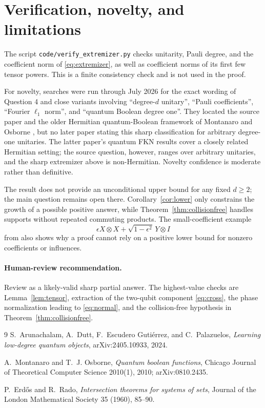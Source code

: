 \documentclass[11pt]{article}
\begin{document}
\section{Verification, novelty, and limitations}

The script \texttt{code/verify\_extremizer.py} checks unitarity, Pauli degree,
and the coefficient norm of \eqref{eq:extremizer}, as well as coefficient
norms of its first few tensor powers.  This is a finite consistency check and
is not used in the proof.

For novelty, searches were run through July 2026 for the exact wording of
Question 4 and close variants involving ``degree-$d$ unitary'', ``Pauli
coefficients'', ``Fourier $\ell_1$ norm'', and ``quantum Boolean degree one''.
They located the source paper and the older Hermitian quantum-Boolean
framework of Montanaro and Osborne \cite{MO}, but no later paper stating this
sharp classification for arbitrary degree-one unitaries.  The latter paper's
quantum FKN results cover a closely related Hermitian setting; the source
question, however, ranges over arbitrary unitaries, and the sharp extremizer
above is non-Hermitian.  Novelty confidence is moderate rather than
definitive.

The result does not provide an unconditional upper bound for any fixed
$d\ge2$; the main question remains open there.  Corollary~\ref{cor:lower}
only constrains the growth of a possible positive answer, while
Theorem~\ref{thm:collisionfree} handles supports without repeated commuting
products.  The small-coefficient example
\[
 \epsilon X\otimes X+\sqrt{1-\epsilon^2}\,Y\otimes I
\]
from \cite{MO} also shows why a proof cannot rely on a positive lower bound
for nonzero coefficients or influences.

\paragraph{Human-review recommendation.}
Review as a likely-valid sharp partial answer.  The highest-value checks are
Lemma~\ref{lem:tensor}, extraction of the two-qubit component
\eqref{eq:cross}, the phase normalization leading to \eqref{eq:normal}, and
the collision-free hypothesis in Theorem~\ref{thm:collisionfree}.

\begin{thebibliography}{9}
S.~Arunachalam, A.~Dutt, F.~Escudero Guti\'errez, and C.~Palazuelos,
\emph{Learning low-degree quantum objects}, arXiv:2405.10933, 2024.

A.~Montanaro and T.~J. Osborne,
\emph{Quantum boolean functions}, Chicago Journal of Theoretical Computer
Science 2010(1), 2010; arXiv:0810.2435.

P.~Erd\H{o}s and R.~Rado,
\emph{Intersection theorems for systems of sets},
Journal of the London Mathematical Society 35 (1960), 85--90.
\end{thebibliography}
\end{document}
